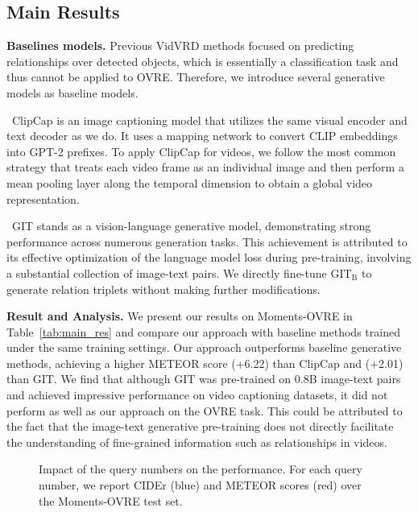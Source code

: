 \documentclass[letterpaper]{article}
\begin{document}
\subsection{Main Results}
\noindent\textbf{Baselines models. }
Previous VidVRD methods focused on predicting relationships over detected objects, which is essentially a classification task and thus cannot be applied to OVRE.
Therefore, we introduce several generative models as baseline models.

\textbullet  \ ClipCap \cite{mokady2021clipcap} is an image captioning model that utilizes the same visual encoder and text decoder as we do.
It uses a mapping network to convert CLIP embeddings into GPT-2 prefixes.
To apply ClipCap for videos, we follow the most common strategy that treats each video frame as an individual image and then perform a mean pooling layer along the temporal dimension to obtain a global video representation.

\textbullet  \ GIT \cite{wang2022git} stands as a vision-language generative model, demonstrating strong performance across numerous generation tasks. This achievement is attributed to its effective optimization of the language model loss during pre-training, involving a substantial collection of image-text pairs.
We directly fine-tune $\text{GIT}_{\text{B}}$ to generate relation triplets without making further modifications.





\noindent\textbf{Result and Analysis. }
We present our results on Moments-OVRE in Table~\ref{tab:main_res} and compare our approach with baseline methods trained under the same training settings.
Our approach outperforms baseline generative methods, achieving a higher METEOR score (+6.22) than ClipCap and (+2.01) than GIT.
We find that although GIT was pre-trained on 0.8B image-text pairs and achieved impressive performance on video captioning datasets, it did not perform as well as our approach on the OVRE task. This could be attributed to the fact that the image-text generative pre-training does not directly facilitate the understanding of fine-grained information such as relationships in videos.

\begin{figure}
  \centering
  \caption{Impact of the query numbers on the performance. For each query number, we report CIDEr (blue) and METEOR scores (red)  over the Moments-OVRE test set. }
   \label{fig:abl_qnumber}
\end{figure}
\end{document}
